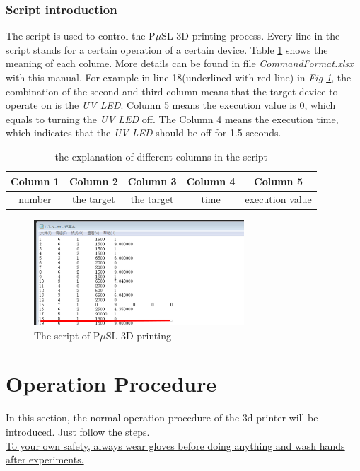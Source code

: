 \documentclass[a4paper]{article}
\begin{document}
\subsubsection{Script introduction}
The script is used to control the P$\mu$SL 3D printing process. Every line in the script stands for a certain operation of 
a certain device. Table \ref{table_script} shows the meaning of each colume. More details can be found in file \textit{CommandFormat.xlsx} 
with this manual. For example in line 18(underlined with red line) in \textit{Fig \ref{script_screen_shot}}, the combination of 
the second and third column means that the target device to operate on is the \textit{UV LED}. Column 5 means the execution value 
is 0, which equals to turning the \textit{UV LED} off. The Column 4 means the execution time, which indicates that the \textit{UV 
LED} should be off for 1.5 seconds.
\begin{table}
  \begin{center}
    \begin{tabular}{ | c | c | c | c | c |}
      \hline
      Column 1 & Column 2 & Column 3 & Column 4 & Column 5 \\
      \hline
      number&the target&the target&time&execution value\\
      \hline
    \end{tabular}
    \caption{the explanation of different columns in the script}\label{table_script}
  \end{center}
\end{table}
\begin{figure}
  \centering
  \includegraphics[width=0.7\textwidth]{script22.png}
  \caption{The script of P$\mu$SL 3D printing }\label{script_screen_shot}
\end{figure}
\clearpage





\section{Operation Procedure}\label{sec:page-layout}
In this section, the normal operation procedure of the 3d-printer will be introduced. Just follow the steps. \\
\underline {To your own safety, always wear gloves before doing anything and wash hands after experiments.}
\end{document}
